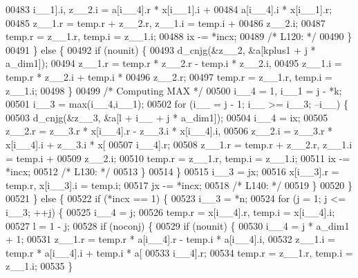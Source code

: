 \begin{DoxyCode}
00483                     i\_\_1].i, z\_\_2.i = a[i\_\_4].r * x[i\_\_1].i + 
00484                     a[i\_\_4].i * x[i\_\_1].r;
00485                 z\_\_1.r = temp.r + z\_\_2.r, z\_\_1.i = temp.i + 
00486                     z\_\_2.i;
00487                 temp.r = z\_\_1.r, temp.i = z\_\_1.i;
00488                 ix -= *incx;
00489 \textcolor{comment}{/* L120: */}
00490             \}
00491             \} \textcolor{keywordflow}{else} \{
00492             \textcolor{keywordflow}{if} (nounit) \{
00493                 d\_cnjg(&z\_\_2, &a[kplus1 + j * a\_dim1]);
00494                 z\_\_1.r = temp.r * z\_\_2.r - temp.i * z\_\_2.i, 
00495                     z\_\_1.i = temp.r * z\_\_2.i + temp.i * 
00496                     z\_\_2.r;
00497                 temp.r = z\_\_1.r, temp.i = z\_\_1.i;
00498             \}
00499 \textcolor{comment}{/* Computing MAX */}
00500             i\_\_4 = 1, i\_\_1 = j - *k;
00501             i\_\_3 = max(i\_\_4,i\_\_1);
00502             \textcolor{keywordflow}{for} (i\_\_ = j - 1; i\_\_ >= i\_\_3; --i\_\_) \{
00503                 d\_cnjg(&z\_\_3, &a[l + i\_\_ + j * a\_dim1]);
00504                 i\_\_4 = ix;
00505                 z\_\_2.r = z\_\_3.r * x[i\_\_4].r - z\_\_3.i * x[i\_\_4].i, 
00506                     z\_\_2.i = z\_\_3.r * x[i\_\_4].i + z\_\_3.i * x[
00507                     i\_\_4].r;
00508                 z\_\_1.r = temp.r + z\_\_2.r, z\_\_1.i = temp.i + 
00509                     z\_\_2.i;
00510                 temp.r = z\_\_1.r, temp.i = z\_\_1.i;
00511                 ix -= *incx;
00512 \textcolor{comment}{/* L130: */}
00513             \}
00514             \}
00515             i\_\_3 = jx;
00516             x[i\_\_3].r = temp.r, x[i\_\_3].i = temp.i;
00517             jx -= *incx;
00518 \textcolor{comment}{/* L140: */}
00519         \}
00520         \}
00521     \} \textcolor{keywordflow}{else} \{
00522         \textcolor{keywordflow}{if} (*incx == 1) \{
00523         i\_\_3 = *n;
00524         \textcolor{keywordflow}{for} (j = 1; j <= i\_\_3; ++j) \{
00525             i\_\_4 = j;
00526             temp.r = x[i\_\_4].r, temp.i = x[i\_\_4].i;
00527             l = 1 - j;
00528             \textcolor{keywordflow}{if} (noconj) \{
00529             \textcolor{keywordflow}{if} (nounit) \{
00530                 i\_\_4 = j * a\_dim1 + 1;
00531                 z\_\_1.r = temp.r * a[i\_\_4].r - temp.i * a[i\_\_4].i, 
00532                     z\_\_1.i = temp.r * a[i\_\_4].i + temp.i * a[
00533                     i\_\_4].r;
00534                 temp.r = z\_\_1.r, temp.i = z\_\_1.i;
00535             \}

\end{DoxyCode}
